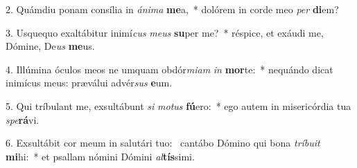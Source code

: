2. Quámdiu ponam consília in \textit{á}\textit{ni}\textit{ma} \textbf{me}a,~*  dolórem in corde meo \textit{per} \textbf{di}em?\

3. Usquequo exaltábitur inimí\textit{cus} \textit{me}\textit{us} \textbf{su}per me?~*  réspice, et exáudi me, Dómine, De\textit{us} \textbf{me}us.\

4. Illúmina óculos meos ne umquam obdór\textit{mi}\textit{am} \textit{in} \textbf{mor}te:~*  nequándo dicat inimícus meus: præválui advér\textit{sus} \textbf{e}um.\

5. Qui tríbulant me, exsultábunt \textit{si} \textit{mo}\textit{tus} \textbf{fú}ero:~*  ego autem in misericórdia tua \textit{spe}\textbf{rá}vi.\

6. Exsultábit cor meum in salutári tuo: \dag\  cantábo Dómino qui bona \textit{trí}\textit{bu}\textit{it} \textbf{mi}hi:~*  et psallam nómini Dómini \textit{al}\textbf{tís}simi.\

